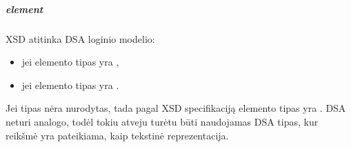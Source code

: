 \documentclass[letterpaper,10pt,lithuanian]{sphinxmanual}
\begin{document}
\subparagraph{element}
\label{\detokenize{schemos/xsd:element}}\label{\detokenize{schemos/xsd:xsd-element}}
\sphinxAtStartPar
XSD {\hyperref[\detokenize{schemos/xsd:xsd-element}]{}} atitinka DSA loginio modelio:
\begin{itemize}
\item {} 
\sphinxAtStartPar
{\hyperref[\detokenize{formatas:model}]{}} \sphinxhyphen{} jei elemento tipas yra {\hyperref[\detokenize{schemos/xsd:xsd-complextype}]{}},

\item {} 
\sphinxAtStartPar
{\hyperref[\detokenize{formatas:property}]{}} \sphinxhyphen{} jei elemento tipas yra {\hyperref[\detokenize{schemos/xsd:xsd-simpletype}]{}}.

\end{itemize}

\sphinxAtStartPar
Jei  tipas nėra nurodytas, tada pagal XSD specifikaciją elemento
tipas yra . DSA neturi  analogo, todėl tokiu atveju
turėtu būti naudojamas DSA  tipas, kur  reikšmė yra
pateikiama, kaip tekstinė reprezentacija.
\end{document}
